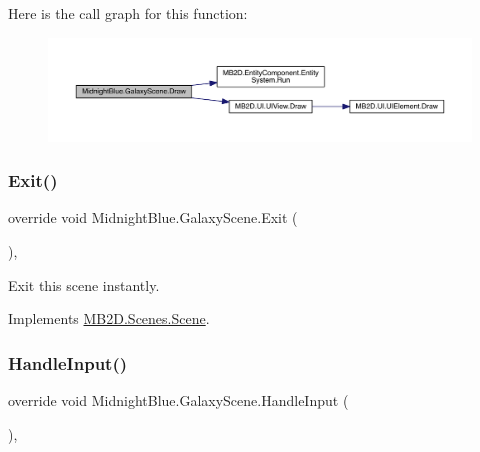 Here is the call graph for this function\+:
\nopagebreak
\begin{figure}[H]
\begin{center}
\leavevmode
\includegraphics[width=350pt]{class_midnight_blue_1_1_galaxy_scene_a3646fcf97e067bac267d42aad66e71c4_cgraph}
\end{center}
\end{figure}
\hypertarget{class_midnight_blue_1_1_galaxy_scene_a7a96978e050da997330bcc0f3cd00f9e}{}\label{class_midnight_blue_1_1_galaxy_scene_a7a96978e050da997330bcc0f3cd00f9e} 
\subsubsection{\texorpdfstring{Exit()}{Exit()}}
{\footnotesize\ttfamily override void Midnight\+Blue.\+Galaxy\+Scene.\+Exit (\begin{DoxyParamCaption}{ }\end{DoxyParamCaption})\hspace{0.3cm}{\ttfamily [inline]}, {\ttfamily [virtual]}}



Exit this scene instantly. 



Implements \hyperlink{class_m_b2_d_1_1_scenes_1_1_scene_a099b79e16d23b67349847999d2336813}{M\+B2\+D.\+Scenes.\+Scene}.

\hypertarget{class_midnight_blue_1_1_galaxy_scene_afd7f8c9f6d0cf6ded10299d4b0015c29}{}\label{class_midnight_blue_1_1_galaxy_scene_afd7f8c9f6d0cf6ded10299d4b0015c29} 
\subsubsection{\texorpdfstring{Handle\+Input()}{HandleInput()}}
{\footnotesize\ttfamily override void Midnight\+Blue.\+Galaxy\+Scene.\+Handle\+Input (\begin{DoxyParamCaption}{ }\end{DoxyParamCaption})\hspace{0.3cm}{\ttfamily [inline]}, {\ttfamily [virtual]}}



